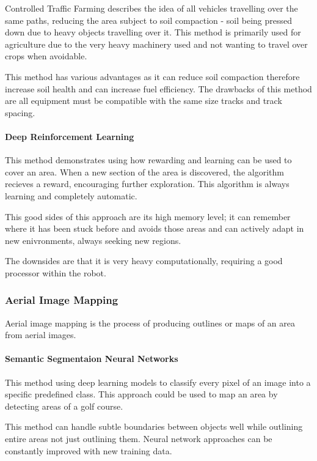 \documentclass[final]{cmpreport_02}
\begin{document}
Controlled Traffic Farming \citep{chamen2015controlled} describes the idea of all vehicles travelling over the same paths, reducing the area subject to soil compaction - soil being pressed down due to heavy objects travelling over it.
This method is primarily used for agriculture due to the very heavy machinery used and not wanting to travel over crops when avoidable.

This method has various advantages as it can reduce soil compaction therefore increase soil health and can increase fuel efficiency.
The drawbacks of this method are all equipment must be compatible with the same size tracks and track spacing.

\paragraph{Deep Reinforcement Learning}
This method \citep{chen2025complete} demonstrates using how rewarding and learning can be used to cover an area. 
When a new section of the area is discovered, the algorithm recieves a reward, encouraging further exploration.
This algorithm is always learning and completely automatic.

This good sides of this approach are its high memory level; it can remember where it has been stuck before and avoids those areas and can actively adapt in new enivronments, always seeking new regions.

The downsides are that it is very heavy computationally, requiring a good processor within the robot.


\subsubsection{Aerial Image Mapping}
Aerial image mapping is the process of producing outlines or maps of an area from aerial images.

\paragraph{Semantic Segmentaion Neural Networks}
This method using deep learning models \citep{long2015fully} to classify every pixel of an image into a specific predefined class.
This approach could be used to map an area by detecting areas of a golf course.

This method can handle subtle boundaries between objects well while outlining entire areas not just outlining them.
Neural network approaches can be constantly improved with new training data.
\end{document}
